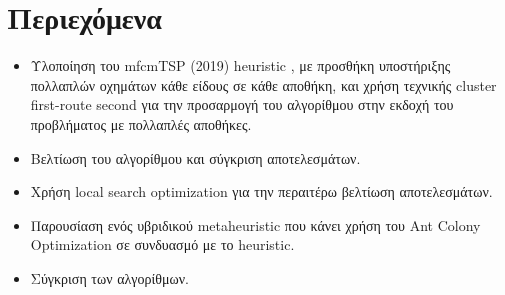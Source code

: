 \documentclass{article}
\begin{document}
	\section{Περιεχόμενα}
	\begin{itemize}
		\item {}Υλοποίηση του mfcmTSP (2019) heuristic , 
		με προσθήκη υποστήριξης πολλαπλών οχημάτων κάθε είδους σε κάθε αποθήκη, και χρήση τεχνικής cluster first-route second  για την προσαρμογή του αλγορίθμου στην εκδοχή του προβλήματος με πολλαπλές αποθήκες.\;
		\item Βελτίωση του αλγορίθμου και σύγκριση αποτελεσμάτων.\;
		\item Χρήση local search optimization για την περαιτέρω βελτίωση αποτελεσμάτων.\;
		\item Παρουσίαση ενός υβριδικού metaheuristic που κάνει χρήση του Ant Colony Optimization σε συνδυασμό με το  heuristic.\;
		\item {}Σύγκριση των αλγορίθμων.\;
	\end{itemize}
	\newpage
\end{document}
